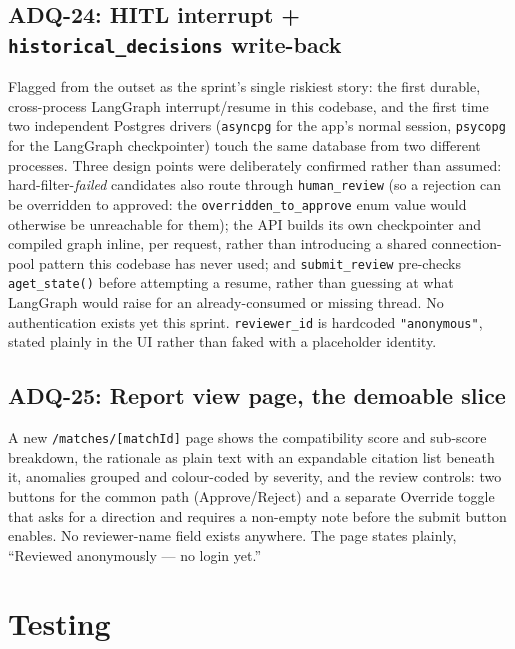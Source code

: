 \subsection{ADQ-24: HITL interrupt + \texttt{historical\_decisions} write-back}
\label{sec:s3-adq24}

Flagged from the outset as the sprint's single riskiest story: the
first durable, cross-process LangGraph interrupt/resume in this
codebase, and the first time two independent Postgres drivers
(\texttt{asyncpg} for the app's normal session, \texttt{psycopg} for
the LangGraph checkpointer) touch the same database from two different
processes. Three design points were deliberately confirmed rather than
assumed: hard-filter-\emph{failed} candidates also route through
\texttt{human\_review} (so a rejection can be overridden to approved:
the \texttt{overridden\_to\_approve} enum value would otherwise be
unreachable for them); the API builds its own checkpointer and compiled
graph inline, per request, rather than introducing a shared
connection-pool pattern this codebase has never used; and
\texttt{submit\_review} pre-checks \texttt{aget\_state()} before
attempting a resume, rather than guessing at what LangGraph would raise
for an already-consumed or missing thread. No authentication exists
yet this sprint. \texttt{reviewer\_id} is hardcoded
\texttt{"anonymous"}, stated plainly in the UI rather than faked with a
placeholder identity.

\subsection{ADQ-25: Report view page, the demoable slice}

A new \texttt{/matches/[matchId]} page shows the
compatibility score and sub-score breakdown, the rationale as plain
text with an expandable citation list beneath it, anomalies grouped and
colour-coded by severity, and the review controls: two buttons for the
common path (Approve/Reject) and a separate Override toggle that asks
for a direction and requires a non-empty note before the submit button
enables. No reviewer-name field exists anywhere. The page states
plainly, ``Reviewed anonymously --- no login yet.''

\section{Testing}
\label{sec:s3-testing}

